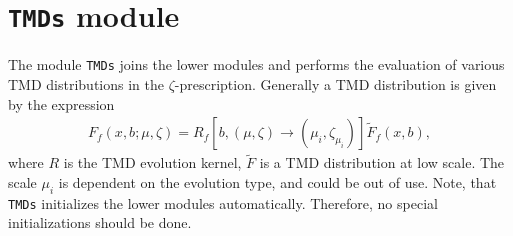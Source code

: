 \documentclass[prd,nofootinbib,eqsecnum,final]{revtex4}
\renewcommand{\(}{\left(}
\renewcommand{\)}{\right)}
\renewcommand{\[}{\left[}
\renewcommand{\]}{\right]}
\begin{document}
\renewcommand{\arraystretch}{1.5}
\newpage


\section{\texttt{TMDs} module}
\label{TMDs}

The module \texttt{TMDs} joins the lower modules and performs the evaluation of various TMD distributions in the $\zeta$-prescription. Generally a TMD distribution is given by the expression
\begin{eqnarray}
F_f(x,b;\mu,\zeta)=R_f[b,(\mu,\zeta)\to(\mu_i,\zeta_{\mu_i})]\tilde F_f(x,b),
\end{eqnarray}
where $R$ is the TMD evolution kernel, $\tilde F$ is a TMD distribution at low scale. The scale $\mu_i$ is dependent on the evolution type, and could be out of use. Note, that \texttt{TMDs} initializes the lower modules automatically. Therefore, no special initializations should be done.
\end{document}
